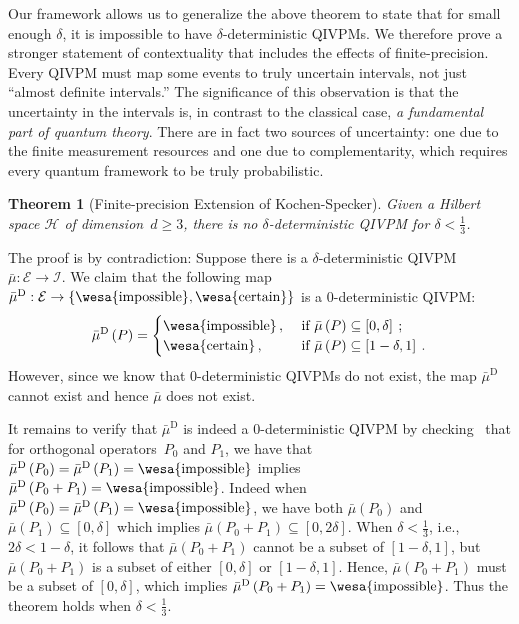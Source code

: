 \documentclass[english,reprint, aps, prl,superscriptaddress, showpacs,
showkeys, longbibliography, amsmath, amssymb, floatfix]{revtex4-1}
\theoremstyle{plain}
\newtheorem{thm}{Theorem}
\theoremstyle{definition}
\newcommand{\Hilb}{\mathcal{H}}
\newcommand{\events}{\ensuremath{\mathcal{E}}}
\newcommand{\imposs}{{\text{\wesa{impossible}}}}
\newcommand{\necess}{{\text{\wesa{certain}}}}
\begin{document}
Our framework allows us to generalize the above theorem to state that
for small enough $\delta$, it is impossible to have
$\delta$-deterministic QIVPMs. We therefore prove a stronger statement of 
contextuality that includes the effects of finite-precision.
Every QIVPM must map some events to
truly uncertain intervals, not just ``almost definite intervals.'' The
significance of this observation is that the uncertainty in the
intervals is, in contrast to the classical case, \emph{a fundamental
  part of quantum theory}. There are in fact two sources of
uncertainty: one due to the finite measurement resources and one due
to complementarity, which requires every quantum framework to be truly
probabilistic.

\begin{thm}[Finite-precision Extension of Kochen-Specker] \label{cor:Kochen-Specker-IVPM} Given a Hilbert space $\Hilb$
  of dimension~$d\ge3$, there is no $\delta$-deterministic QIVPM for
  $\delta<\frac{1}{3}$.\end{thm}

The proof is by contradiction: Suppose there is a
$\delta$-deterministic
QIVPM~$\bar{\mu}:\events\rightarrow\mathscr{I}$. We claim that the
following
map~$\bar{\mu}^{\textrm{D}}:\events\rightarrow\left\{
  \imposs,\necess\right\} $ is a 0-deterministic QIVPM:
\begin{equation}
\bar{\mu}^{\textrm{D}}\left(P\right)=\begin{cases}
\imposs\,, & \textrm{ if }\bar{\mu}\left(P\right)\subseteq\left[0,\delta\right]\:;\\
\necess\,, & \textrm{ if }\bar{\mu}\left(P\right)\subseteq\left[1-\delta,1\right]\:.
\end{cases}
\end{equation}
However, since we know that 0-deterministic QIVPMs do not exist, the
map $\bar{\mu}^{\textrm{D}}$ cannot exist and hence $\bar{\mu}$ does
not exist.

It remains to verify that $\bar{\mu}^{\textrm{D}}$ is indeed a
0-deterministic QIVPM by checking~\citep{HOSTunpublished} that for orthogonal
operators~$P_{0}$ and $P_{1}$, we have that
$\bar{\mu}^{\textrm{D}}\left(P_{0}\right)=\bar{\mu}^{\textrm{D}}\left(P_{1}\right)=\imposs$
implies
$\bar{\mu}^{\textrm{D}}\left(P_{0}+P_{1}\right)=\imposs$. Indeed when
$\bar{\mu}^{\textrm{D}}\left(P_{0}\right)=\bar{\mu}^{\textrm{D}}\left(P_{1}\right)=\imposs$,
we have both $\bar{\mu}\left(P_{0}\right)$ and
$\bar{\mu}\left(P_{1}\right)\subseteq\left[0,\delta\right]$ which
implies
$\bar{\mu}\left(P_{0}+P_{1}\right)\subseteq\left[0,2\delta\right]$.
When $\delta<\frac{1}{3}$, i.e., $2\delta<1-\delta$, it follows that
$\bar{\mu}\left(P_{0}+P_{1}\right)$ cannot be a subset of
$\left[1-\delta,1\right]$, but $\bar{\mu}\left(P_{0}+P_{1}\right)$ is
a subset of either $\left[0,\delta\right]$ or
$\left[1-\delta,1\right]$.  Hence, $\bar{\mu}\left(P_{0}+P_{1}\right)$
must be a subset of $\left[0,\delta\right]$, which implies
$\bar{\mu}^{\textrm{D}}\left(P_{0}+P_{1}\right)=\imposs$. Thus the
theorem holds when $\delta<\frac{1}{3}$.
\end{document}
